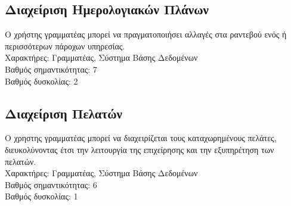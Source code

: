 \documentclass[12pt]{article}
\begin{document}
\subsection{Διαχείριση Ημερολογιακών Πλάνων}
Ο χρήστης γραμματέας μπορεί να πραγματοποιήσει αλλαγές στα ραντεβού ενός ή περισσότερων πάροχων υπηρεσίας. 
\\[0.3cm] 
Χαρακτήρες: Γραμματέας, Σύστημα Βάσης Δεδομένων
\\[0.3cm]
Βαθμός σημαντικότητας: 7
\\[0.3cm]
Βαθμός δυσκολίας: 2

\subsection{Διαχείριση Πελατών}
Ο χρηστης γραμματέας μπορεί να διαχειρίζεται τους καταχωρημένους πελάτες, διευκολύνοντας έτσι την λειτουργία της επιχείρησης και την εξυπηρέτηση των πελατών.
\\[0.3cm] 
Χαρακτήρες: Γραμματέας, Σύστημα Βάσης Δεδομένων
\\[0.3cm]
Βαθμός σημαντικότητας: 6
\\[0.3cm]
Βαθμός δυσκολίας: 1
\end{document}
